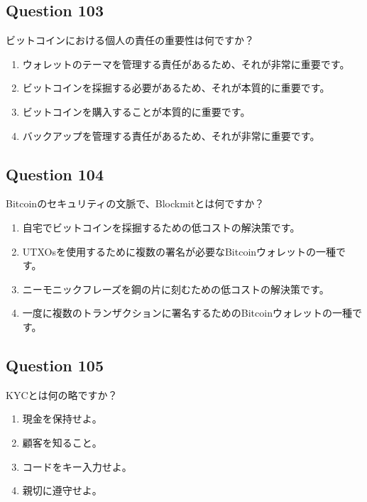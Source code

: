 \documentclass[12pt,a4paper]{article}
\begin{document}
\bigskip


\subsection*{Question 103}
ビットコインにおける個人の責任の重要性は何ですか？

\begin{enumerate}[label=\Alph*., leftmargin=*]
\item ウォレットのテーマを管理する責任があるため、それが非常に重要です。
\item ビットコインを採掘する必要があるため、それが本質的に重要です。
\item ビットコインを購入することが本質的に重要です。
\item バックアップを管理する責任があるため、それが非常に重要です。
\end{enumerate}

\bigskip


\subsection*{Question 104}
Bitcoinのセキュリティの文脈で、Blockmitとは何ですか？

\begin{enumerate}[label=\Alph*., leftmargin=*]
\item 自宅でビットコインを採掘するための低コストの解決策です。
\item UTXOsを使用するために複数の署名が必要なBitcoinウォレットの一種です。
\item ニーモニックフレーズを鋼の片に刻むための低コストの解決策です。
\item 一度に複数のトランザクションに署名するためのBitcoinウォレットの一種です。
\end{enumerate}

\bigskip


\subsection*{Question 105}
KYCとは何の略ですか？

\begin{enumerate}[label=\Alph*., leftmargin=*]
\item 現金を保持せよ。
\item 顧客を知ること。
\item コードをキー入力せよ。
\item 親切に遵守せよ。
\end{enumerate}
\end{document}
